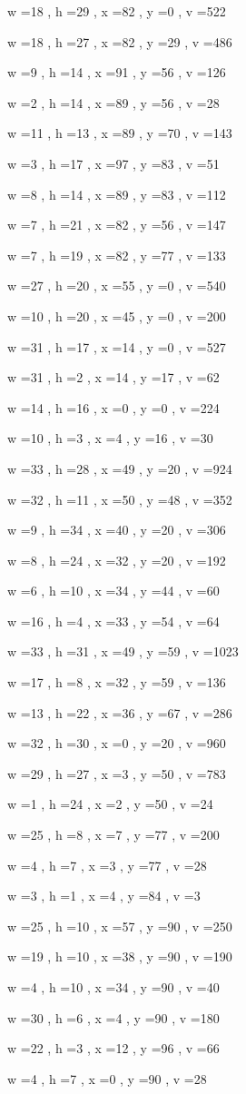 \documentclass[11pt]{article}
\begin{document}
w =18 , h =29 , x =82 , y =0 , v =522
\par
w =18 , h =27 , x =82 , y =29 , v =486
\par
w =9 , h =14 , x =91 , y =56 , v =126
\par
w =2 , h =14 , x =89 , y =56 , v =28
\par
w =11 , h =13 , x =89 , y =70 , v =143
\par
w =3 , h =17 , x =97 , y =83 , v =51
\par
w =8 , h =14 , x =89 , y =83 , v =112
\par
w =7 , h =21 , x =82 , y =56 , v =147
\par
w =7 , h =19 , x =82 , y =77 , v =133
\par
w =27 , h =20 , x =55 , y =0 , v =540
\par
w =10 , h =20 , x =45 , y =0 , v =200
\par
w =31 , h =17 , x =14 , y =0 , v =527
\par
w =31 , h =2 , x =14 , y =17 , v =62
\par
w =14 , h =16 , x =0 , y =0 , v =224
\par
w =10 , h =3 , x =4 , y =16 , v =30
\par
w =33 , h =28 , x =49 , y =20 , v =924
\par
w =32 , h =11 , x =50 , y =48 , v =352
\par
w =9 , h =34 , x =40 , y =20 , v =306
\par
w =8 , h =24 , x =32 , y =20 , v =192
\par
w =6 , h =10 , x =34 , y =44 , v =60
\par
w =16 , h =4 , x =33 , y =54 , v =64
\par
w =33 , h =31 , x =49 , y =59 , v =1023
\par
w =17 , h =8 , x =32 , y =59 , v =136
\par
w =13 , h =22 , x =36 , y =67 , v =286
\par
w =32 , h =30 , x =0 , y =20 , v =960
\par
w =29 , h =27 , x =3 , y =50 , v =783
\par
w =1 , h =24 , x =2 , y =50 , v =24
\par
w =25 , h =8 , x =7 , y =77 , v =200
\par
w =4 , h =7 , x =3 , y =77 , v =28
\par
w =3 , h =1 , x =4 , y =84 , v =3
\par
w =25 , h =10 , x =57 , y =90 , v =250
\par
w =19 , h =10 , x =38 , y =90 , v =190
\par
w =4 , h =10 , x =34 , y =90 , v =40
\par
w =30 , h =6 , x =4 , y =90 , v =180
\par
w =22 , h =3 , x =12 , y =96 , v =66
\par
w =4 , h =7 , x =0 , y =90 , v =28
\par
\newpage
\end{document}
